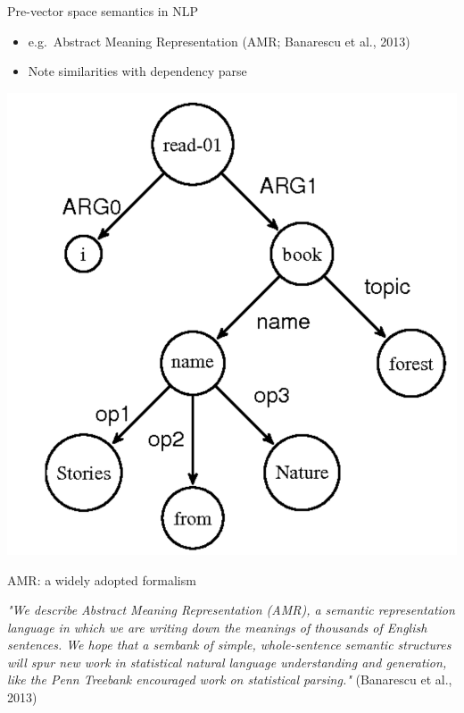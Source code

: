 \documentclass{beamer}
\begin{document}
\begin{frame}{Pre-vector space semantics in NLP}

  \begin{itemize}
  \item e.g.\ Abstract Meaning Representation (AMR; Banarescu et al., 2013)
  \item Note similarities with dependency parse
  \end{itemize}
  
  \vspace{0.4cm}

  \includegraphics[height=0.7\textheight]{figures/amr}
\end{frame}

\begin{frame}{AMR: a widely adopted formalism}

  {\it "We describe Abstract Meaning Representation (AMR), a semantic
    representation language in which we are writing down the meanings
    of thousands of English sentences. We hope that a sembank of
    simple, whole-sentence semantic structures will spur new work in
    statistical natural language understanding and generation, like
    the Penn Treebank encouraged work on statistical parsing."}
  (Banarescu et al., 2013)
	
\end{frame}
\end{document}
